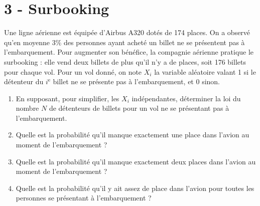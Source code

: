 \section*{3 - Surbooking}
Une ligne aérienne est équipée d'Airbus A320 dotés de 174 places. On a observé qu'en moyenne $3 \%$ des personnes ayant acheté un billet ne se présentent pas à l'embarquement. Pour augmenter son bénéfice, la compagnie aérienne pratique le surbooking : elle vend deux billets de plus qu'il n'y a de places, soit 176 billets pour chaque vol. Pour un vol donné, on note $X_i$ la variable aléatoire valant 1 si le détenteur du $i^{\mathrm{e}}$ billet ne se présente pas à l'embarquement, et 0 sinon.
\begin{enumerate}
    \item En supposant, pour simplifier, les $X_i$ indépendantes, déterminer la loi du nombre $N$ de détenteurs de billets pour un vol ne se présentant pas à l'embarquement.
    \item Quelle est la probabilité qu'il manque exactement une place dans l'avion au moment de l'embarquement ?
    \item Quelle est la probabilité qu'il manque exactement deux places dans l'avion au moment de l'embarquement ?
    \item Quelle est la probabilité qu'il y ait assez de place dans l'avion pour toutes les personnes se présentant à l'embarquement ?
    \vspace{1em}
    

\end{enumerate}

